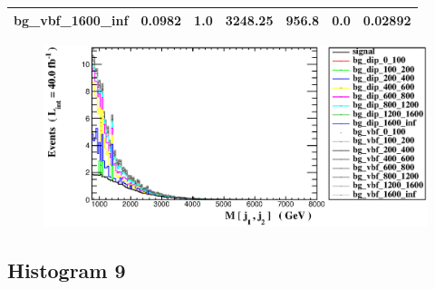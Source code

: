 \documentclass[a4paper, 10pt]{article}
\begin{document}
\begin{table}[H]
\begin{center}
\begin{tabular}{|m{23.0mm}|m{23.0mm}|m{18.0mm}|m{19.0mm}|m{19.0mm}|m{19.0mm}|m{19.0mm}|}
      \hline
      {\cellcolor{white}         bg\_vbf\_1600\_inf}& {\cellcolor{white}         0.0982}& {\cellcolor{white}         1.0}& {\cellcolor{white}         3248.25}& {\cellcolor{white}         956.8}& {\cellcolor{green}         0.0}& {\cellcolor{green}         0.02892}\\
\hline
    \end{tabular}
  \end{center}
\end{table}

\begin{figure}[H]
  \begin{center}
    \includegraphics[scale=0.45]{selection_7.eps}\\
\caption{   }
  \end{center}
\end{figure}
      \newpage
\subsection{ Histogram 9}
\end{document}
